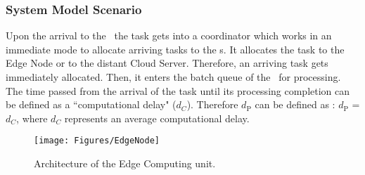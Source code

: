 \subsubsection{\textbf{System Model Scenario}}
Upon the arrival to the \pu~the task gets into a coordinator which works in an immediate mode to allocate arriving tasks to the \pu s. It allocates the task to the Edge Node or to the distant Cloud Server. Therefore, an arriving task gets immediately allocated. Then, it enters the batch queue of the \pu~for processing. The time passed from the arrival of the task until its processing completion can be defined as a ``computational delay" ($d_C$). Therefore $d_\textrm{P}$ can be defined as :  $d_\textrm{P}$ = $d_C$, where $d_C$ represents an average computational delay.

\begin{figure}[h]
	\centering	
	\texttt{[image: Figures/EdgeNode]}
	\caption{Architecture of the Edge Computing unit.}
\end{figure}



